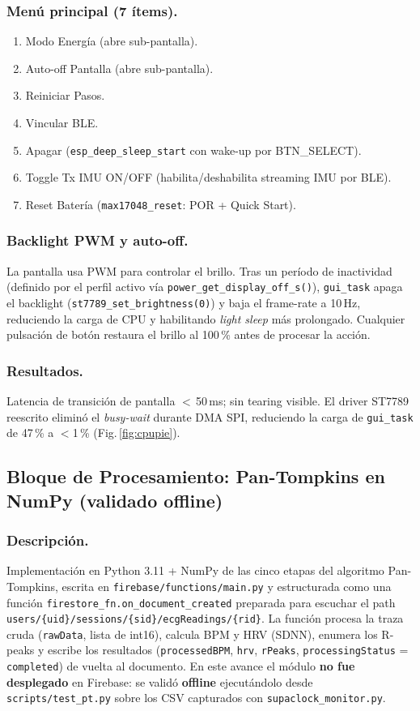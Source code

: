 \documentclass[letterpaper,11pt]{article}
\newcommand{\rfigura}[1]{Fig.\,\ref{#1}}
\begin{document}
\subsubsection{Menú principal (7 ítems).}
\begin{enumerate}
    \item Modo Energía (abre sub-pantalla).
    \item Auto-off Pantalla (abre sub-pantalla).
    \item Reiniciar Pasos.
    \item Vincular BLE.
    \item Apagar (\texttt{esp\_deep\_sleep\_start} con wake-up por BTN\_SELECT).
    \item Toggle Tx IMU ON/OFF (habilita/deshabilita streaming IMU por BLE).
    \item Reset Batería (\texttt{max17048\_reset}: POR + Quick Start).
\end{enumerate}

\subsubsection{Backlight PWM y auto-off.} La pantalla usa PWM para controlar el brillo.
Tras un período de inactividad (definido por el perfil activo vía
\texttt{power\_get\_display\_off\_s()}), \texttt{gui\_task} apaga el backlight
(\texttt{st7789\_set\_brightness(0)}) y baja el frame-rate a 10\,Hz, reduciendo la carga
de CPU y habilitando \textit{light sleep} más prolongado. Cualquier pulsación de botón
restaura el brillo al 100\,\% antes de procesar la acción.

\subsubsection{Resultados.} Latencia de transición de pantalla $<$\,50\,ms; sin tearing visible.
El driver ST7789 reescrito eliminó el \textit{busy-wait} durante DMA SPI, reduciendo
la carga de \texttt{gui\_task} de 47\,\% a $<$1\,\% (\rfigura{fig:cpupie}).

\subsection{Bloque de Procesamiento: Pan-Tompkins en NumPy (validado offline)}
\subsubsection{Descripción.} Implementación en Python 3.11 + NumPy de las cinco etapas del
algoritmo Pan-Tompkins, escrita en \texttt{firebase/functions/main.py} y estructurada como
una función \texttt{firestore\_fn.on\_document\_created} preparada para escuchar el path
\texttt{users/\{uid\}/sessions/\{sid\}/ecgReadings/\{rid\}}. La función procesa la traza
cruda (\texttt{rawData}, lista de int16), calcula BPM y HRV (SDNN), enumera los R-peaks y
escribe los resultados (\texttt{processedBPM}, \texttt{hrv}, \texttt{rPeaks},
\texttt{processingStatus} = \texttt{completed}) de vuelta al documento. En este avance el
módulo \textbf{no fue desplegado} en Firebase: se validó \textbf{offline} ejecutándolo
desde \texttt{scripts/test\_pt.py} sobre los CSV capturados con
\texttt{supaclock\_monitor.py}.
\end{document}
